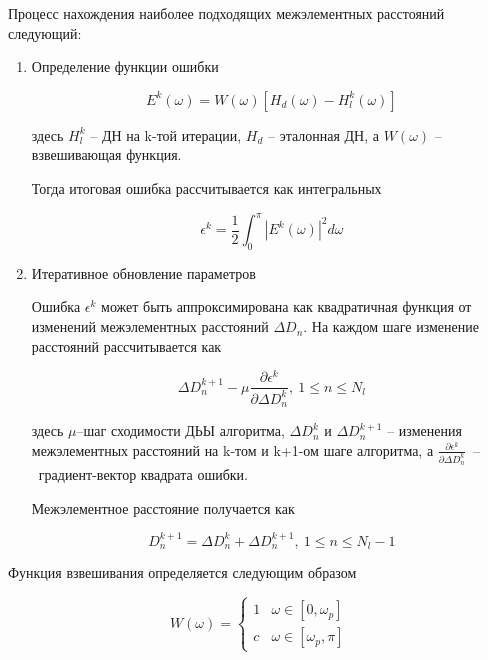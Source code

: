 Процесс нахождения наиболее подходящих межэлементных расстояний следующий:
\begin{sloppypar}
    \begin{enumerate}
        \item Определение функции ошибки

              $$
                  E^k (\omega) = W(\omega)\left[H_d(\omega)-H_l^k (\omega)\right]
              $$

              здесь $H_l^k$ -- ДН на k-той итерации, $H_d$ -- эталонная ДН, а $W(\omega)$ -- взвешивающая функция.

              Тогда итоговая ошибка рассчитывается как интегральных

              $$
                  \epsilon^k = \frac{1}{2} \int_{0}^{\pi}{ \left| E^k(\omega) \right|^2 d\omega}
              $$

        \item Итеративное обновление параметров

              Ошибка $\epsilon^k$ может быть аппроксимирована как квадратичная функция от изменений межэлементных расстояний
              $\Delta D_n$. На каждом шаге изменение расстояний рассчитывается как

              $$
                  \Delta D_{n}^{k+1}-\mu \frac{\partial \epsilon^k}{\partial \Delta D_n^k},\ 1\leq n \leq N_l
              $$

              здесь $\mu$--шаг сходимости ДЬЫ алгоритма, $\Delta D_n^k$ и $\Delta D_n^{k+1}$ -- изменения межэлементных расстояний на {k-том} и {k+1-ом} шаге алгоритма, а $\frac{\partial \epsilon^k}{\partial \Delta D_n^k}$~--~градиент-вектор квадрата ошибки.

              Межэлементное расстояние получается как

              $$
                  D_{n}^{k+1} = \Delta D_{n}^{k} + \Delta D_{n}^{k+1}, \ 1\leq n \leq N_l - 1
              $$

    \end{enumerate}
\end{sloppypar}

Функция взвешивания определяется следующим образом

\begin{equation*}
    W(\omega) =
    \begin{cases}
        1 & \text{$\omega\in [0, \omega_p]$}    \\
        c & \text{$\omega \in [\omega_p, \pi]$}
    \end{cases}
\end{equation*}

